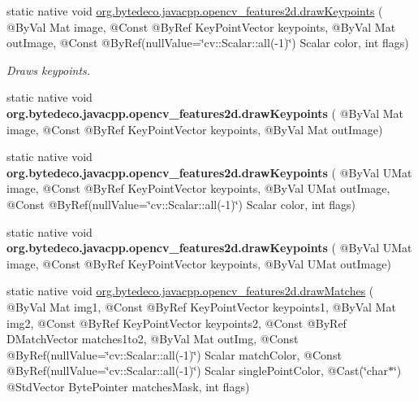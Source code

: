 \begin{DoxyCompactItemize}
\item 
static native void \hyperlink{group__features2d__draw_gab17ce5fe7286fa915dae6cdf8cb80740}{org.\+bytedeco.\+javacpp.\+opencv\+\_\+features2d.\+draw\+Keypoints} ( @By\+Val Mat image, @Const @By\+Ref Key\+Point\+Vector keypoints, @By\+Val Mat out\+Image, @Const @By\+Ref(null\+Value=\char`\"{}cv\+::\+Scalar\+::all(-\/1)\char`\"{}) Scalar color, int flags)
\begin{DoxyCompactList}\small\item\em Draws keypoints. \end{DoxyCompactList}\item 
\mbox{\label{group__features2d__draw_ga18aef9cb01994f0af254ab372f831ac6}} 
static native void {\bfseries org.\+bytedeco.\+javacpp.\+opencv\+\_\+features2d.\+draw\+Keypoints} ( @By\+Val Mat image, @Const @By\+Ref Key\+Point\+Vector keypoints, @By\+Val Mat out\+Image)
\item 
\mbox{\label{group__features2d__draw_ga4c4a23f95c14884ca3395e2fb4ad3733}} 
static native void {\bfseries org.\+bytedeco.\+javacpp.\+opencv\+\_\+features2d.\+draw\+Keypoints} ( @By\+Val U\+Mat image, @Const @By\+Ref Key\+Point\+Vector keypoints, @By\+Val U\+Mat out\+Image, @Const @By\+Ref(null\+Value=\char`\"{}cv\+::\+Scalar\+::all(-\/1)\char`\"{}) Scalar color, int flags)
\item 
\mbox{\label{group__features2d__draw_ga23b952684915256406806d2bb36f2f09}} 
static native void {\bfseries org.\+bytedeco.\+javacpp.\+opencv\+\_\+features2d.\+draw\+Keypoints} ( @By\+Val U\+Mat image, @Const @By\+Ref Key\+Point\+Vector keypoints, @By\+Val U\+Mat out\+Image)
\item 
static native void \hyperlink{group__features2d__draw_gac84f37b93a8b6d5358211ec9b6d4799e}{org.\+bytedeco.\+javacpp.\+opencv\+\_\+features2d.\+draw\+Matches} ( @By\+Val Mat img1, @Const @By\+Ref Key\+Point\+Vector keypoints1, @By\+Val Mat img2, @Const @By\+Ref Key\+Point\+Vector keypoints2, @Const @By\+Ref D\+Match\+Vector matches1to2, @By\+Val Mat out\+Img, @Const @By\+Ref(null\+Value=\char`\"{}cv\+::\+Scalar\+::all(-\/1)\char`\"{}) Scalar match\+Color, @Const @By\+Ref(null\+Value=\char`\"{}cv\+::\+Scalar\+::all(-\/1)\char`\"{}) Scalar single\+Point\+Color, @Cast(\char`\"{}char$\ast$\char`\"{}) @Std\+Vector Byte\+Pointer matches\+Mask, int flags)

\end{DoxyCompactItemize}
